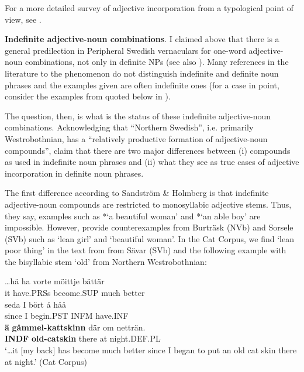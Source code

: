 For a more detailed survey of adjective incorporation from a typological point of view, see \citet[225-236]{Dahl2004}.

\textbf{Indefinite adjective-noun combinations}. I claimed above that there is a general predilection in Peripheral Swedish vernaculars for one-word adjective-noun combinations, not only in definite NPs (see also \citet[44, Fn 19]{Delsing2003a}). Many references in the literature to the phenomenon do not distinguish indefinite and definite noun phrases and the examples given are often indefinite ones (for a case in point, consider the examples from \citet{Hedblom1978} quoted below in ). 

The question, then, is what is the status of these indefinite adjective-noun combinations. Acknowledging that “Northern Swedish”, i.e. primarily Westrobothnian, has a “relatively productive formation of adjective-noun compounds”, \citet[91]{SandströmEtAl2003} claim that there are two major differences between (i) compounds as used in indefinite noun phrases and (ii) what they see as true cases of adjective incorporation in definite noun phrases.

The first difference according to Sandström \& Holmberg is that indefinite adjective-noun compounds are restricted to monosyllabic adjective stems. Thus, they say, examples such as *‘a beautiful woman’ and *‘an able boy’ are impossible. However, \citet[47]{BergholmEtAl1999} provide counterexamples from Burträsk (NVb) and Sorsele (SVb) such as  ‘lean girl’ and  ‘beautiful woman’. In the Cat Corpus, we find  ‘lean poor thing’ in the text from from Sävar (SVb) and the following example with the bisyllabic stem  ‘old’ from Northern Westrobothnian:

\ea\label{}
\gll …hä  ha  vorte  möittje  bättär\\
it  have.PRSs  become.SUP  much  better\\
\gll seda  I  bört  å  håå\\
since  I  begin.PST  INFM  have.INF\\
\gll \textbf{ä}\textbf{  gåmmel-kattskinn} där  om  netträn.\\
\textbf{INDF} \textbf{old-catskin} there  at   night.DEF.PL\\
\glt ‘…it [my back] has become much better since I began to put an old cat skin there at night.’ (Cat Corpus) 
\z

